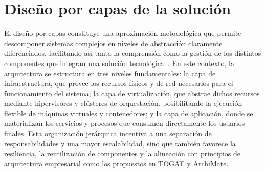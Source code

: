 \section{Diseño por capas de la solución}
\noindent
El diseño por capas constituye una aproximación metodológica que permite descomponer sistemas complejos en niveles de abstracción claramente diferenciados, facilitando así tanto la comprensión como la gestión de los distintos componentes que integran una solución tecnológica~\citep{Spray2023}. En este contexto, la arquitectura se estructura en tres niveles fundamentales: la capa de infraestructura, que provee los recursos físicos y de red necesarios para el funcionamiento del sistema; la capa de virtualización, que abstrae dichos recursos mediante hipervisores y clústeres de orquestación, posibilitando la ejecución flexible de máquinas virtuales y contenedores; y la capa de aplicación, donde se materializan los servicios y procesos que consumen directamente los usuarios finales. Esta organización jerárquica incentiva a una separación de responsabilidades y una mayor escalabilidad, sino que también favorece la resiliencia, la reutilización de componentes y la alineación con principios de arquitectura empresarial como los propuestos en TOGAF y ArchiMate.

